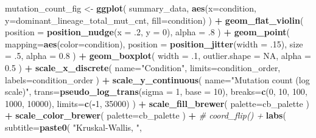 \documentclass[]{book}
\newenvironment{Shaded}{\begin{snugshade}}{\end{snugshade}}
\newcommand{\CommentTok}[1]{\textcolor[rgb]{0.56,0.35,0.01}{\textit{#1}}}
\newcommand{\DataTypeTok}[1]{\textcolor[rgb]{0.13,0.29,0.53}{#1}}
\newcommand{\DecValTok}[1]{\textcolor[rgb]{0.00,0.00,0.81}{#1}}
\newcommand{\FloatTok}[1]{\textcolor[rgb]{0.00,0.00,0.81}{#1}}
\newcommand{\KeywordTok}[1]{\textcolor[rgb]{0.13,0.29,0.53}{\textbf{#1}}}
\newcommand{\NormalTok}[1]{#1}
\newcommand{\OperatorTok}[1]{\textcolor[rgb]{0.81,0.36,0.00}{\textbf{#1}}}
\newcommand{\OtherTok}[1]{\textcolor[rgb]{0.56,0.35,0.01}{#1}}
\newcommand{\StringTok}[1]{\textcolor[rgb]{0.31,0.60,0.02}{#1}}
\begin{document}
\begin{Shaded}
\begin{Highlighting}[]
{{{{\NormalTok{mutation_count_fig <-}\StringTok{ }\KeywordTok{ggplot}\NormalTok{(}
\NormalTok{    summary_data,}
    \KeywordTok{aes}\NormalTok{(}\DataTypeTok{x=}\NormalTok{condition, }\DataTypeTok{y=}\NormalTok{dominant_lineage_total_mut_cnt, }\DataTypeTok{fill=}\NormalTok{condition)}
\NormalTok{  ) }\OperatorTok{+}
\StringTok{  }\KeywordTok{geom_flat_violin}\NormalTok{(}
    \DataTypeTok{position =} \KeywordTok{position_nudge}\NormalTok{(}\DataTypeTok{x =} \FloatTok{.2}\NormalTok{, }\DataTypeTok{y =} \DecValTok{0}\NormalTok{),}
    \DataTypeTok{alpha =} \FloatTok{.8}
\NormalTok{  ) }\OperatorTok{+}
\StringTok{  }\KeywordTok{geom_point}\NormalTok{(}
    \DataTypeTok{mapping=}\KeywordTok{aes}\NormalTok{(}\DataTypeTok{color=}\NormalTok{condition),}
    \DataTypeTok{position =} \KeywordTok{position_jitter}\NormalTok{(}\DataTypeTok{width =} \FloatTok{.15}\NormalTok{),}
    \DataTypeTok{size =} \FloatTok{.5}\NormalTok{,}
    \DataTypeTok{alpha =} \FloatTok{0.8}
\NormalTok{  ) }\OperatorTok{+}
\StringTok{  }\KeywordTok{geom_boxplot}\NormalTok{(}
    \DataTypeTok{width =} \FloatTok{.1}\NormalTok{,}
    \DataTypeTok{outlier.shape =} \OtherTok{NA}\NormalTok{,}
    \DataTypeTok{alpha =} \FloatTok{0.5}
\NormalTok{  ) }\OperatorTok{+}
\StringTok{  }\KeywordTok{scale_x_discrete}\NormalTok{(}
    \DataTypeTok{name=}\StringTok{"Condition"}\NormalTok{,}
    \DataTypeTok{limits=}\NormalTok{condition_order,}
    \DataTypeTok{labels=}\NormalTok{condition_order}
\NormalTok{  ) }\OperatorTok{+}
\StringTok{  }\KeywordTok{scale_y_continuous}\NormalTok{(}
    \DataTypeTok{name=}\StringTok{"Mutation count (log scale)"}\NormalTok{,}
    \DataTypeTok{trans=}\KeywordTok{pseudo_log_trans}\NormalTok{(}\DataTypeTok{sigma =} \DecValTok{1}\NormalTok{, }\DataTypeTok{base =} \DecValTok{10}\NormalTok{),}
    \DataTypeTok{breaks=}\KeywordTok{c}\NormalTok{(}\DecValTok{0}\NormalTok{, }\DecValTok{10}\NormalTok{, }\DecValTok{100}\NormalTok{, }\DecValTok{1000}\NormalTok{, }\DecValTok{10000}\NormalTok{),}
    \DataTypeTok{limits=}\KeywordTok{c}\NormalTok{(}\OperatorTok{-}\DecValTok{1}\NormalTok{, }\DecValTok{35000}\NormalTok{)}
\NormalTok{  ) }\OperatorTok{+}
\StringTok{  }\KeywordTok{scale_fill_brewer}\NormalTok{(}
    \DataTypeTok{palette=}\NormalTok{cb_palette}
\NormalTok{  ) }\OperatorTok{+}
\StringTok{  }\KeywordTok{scale_color_brewer}\NormalTok{(}
    \DataTypeTok{palette=}\NormalTok{cb_palette}
\NormalTok{  ) }\OperatorTok{+}
\StringTok{  }\CommentTok{# coord_flip() +}
\StringTok{  }\KeywordTok{labs}\NormalTok{(}
    \DataTypeTok{subtitle=}\KeywordTok{paste0}\NormalTok{(}
      \StringTok{"Kruskal-Wallis, "}\NormalTok{,}
}}}}
\end{Highlighting}
\end{Shaded}
\end{document}
